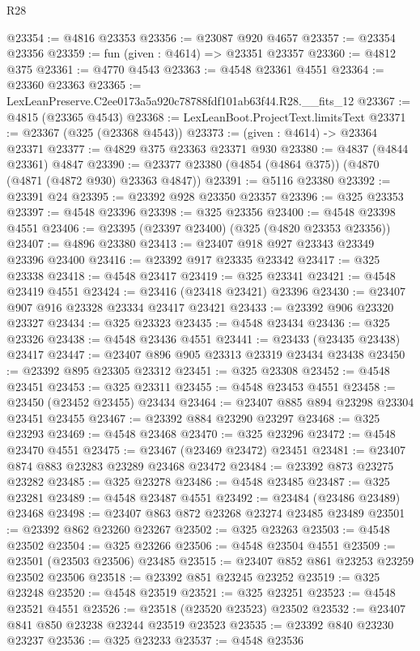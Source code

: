 \begin{lexlean}{R28}
\begin{coremodule}
@23354 := @4816 @23353
@23356 := @23087 @920 @4657
@23357 := @23354 @23356
@23359 := fun (given : @4614) => @23351 @23357
@23360 := @4812 @375
@23361 := @4770 @4543
@23363 := @4548 @23361 @4551
@23364 := @23360 @23363
@23365 := LexLeanPreserve.C2ee0173a5a920c78788fdf101ab63f44.R28.__fits_12
@23367 := @4815 (@23365 @4543)
@23368 := LexLeanBoot.ProjectText.limitsText
@23371 := @23367 (@325 (@23368 @4543))
@23373 := (given : @4614) -> @23364 @23371
@23377 := @4829 @375 @23363 @23371 @930
@23380 := @4837 (@4844 @23361) @4847
@23390 := @23377 @23380 (@4854 (@4864 @375)) (@4870 (@4871 (@4872 @930) @23363 @4847))
@23391 := @5116 @23380
@23392 := @23391 @24
@23395 := @23392 @928 @23350 @23357
@23396 := @325 @23353
@23397 := @4548 @23396
@23398 := @325 @23356
@23400 := @4548 @23398 @4551
@23406 := @23395 (@23397 @23400) (@325 (@4820 @23353 @23356))
@23407 := @4896 @23380
@23413 := @23407 @918 @927 @23343 @23349 @23396 @23400
@23416 := @23392 @917 @23335 @23342
@23417 := @325 @23338
@23418 := @4548 @23417
@23419 := @325 @23341
@23421 := @4548 @23419 @4551
@23424 := @23416 (@23418 @23421) @23396
@23430 := @23407 @907 @916 @23328 @23334 @23417 @23421
@23433 := @23392 @906 @23320 @23327
@23434 := @325 @23323
@23435 := @4548 @23434
@23436 := @325 @23326
@23438 := @4548 @23436 @4551
@23441 := @23433 (@23435 @23438) @23417
@23447 := @23407 @896 @905 @23313 @23319 @23434 @23438
@23450 := @23392 @895 @23305 @23312
@23451 := @325 @23308
@23452 := @4548 @23451
@23453 := @325 @23311
@23455 := @4548 @23453 @4551
@23458 := @23450 (@23452 @23455) @23434
@23464 := @23407 @885 @894 @23298 @23304 @23451 @23455
@23467 := @23392 @884 @23290 @23297
@23468 := @325 @23293
@23469 := @4548 @23468
@23470 := @325 @23296
@23472 := @4548 @23470 @4551
@23475 := @23467 (@23469 @23472) @23451
@23481 := @23407 @874 @883 @23283 @23289 @23468 @23472
@23484 := @23392 @873 @23275 @23282
@23485 := @325 @23278
@23486 := @4548 @23485
@23487 := @325 @23281
@23489 := @4548 @23487 @4551
@23492 := @23484 (@23486 @23489) @23468
@23498 := @23407 @863 @872 @23268 @23274 @23485 @23489
@23501 := @23392 @862 @23260 @23267
@23502 := @325 @23263
@23503 := @4548 @23502
@23504 := @325 @23266
@23506 := @4548 @23504 @4551
@23509 := @23501 (@23503 @23506) @23485
@23515 := @23407 @852 @861 @23253 @23259 @23502 @23506
@23518 := @23392 @851 @23245 @23252
@23519 := @325 @23248
@23520 := @4548 @23519
@23521 := @325 @23251
@23523 := @4548 @23521 @4551
@23526 := @23518 (@23520 @23523) @23502
@23532 := @23407 @841 @850 @23238 @23244 @23519 @23523
@23535 := @23392 @840 @23230 @23237
@23536 := @325 @23233
@23537 := @4548 @23536

\end{coremodule}
\end{lexlean}
